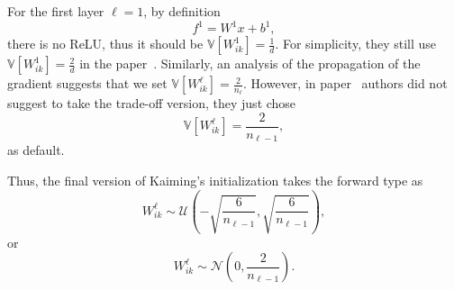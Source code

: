 For the first layer $\ell=1$, by definition
\begin{equation}\label{key}
f^1 = W^1 x + b^1,
\end{equation}
there is no ReLU, thus it should be $\mathbb{V}[W^1_{ik}] = \frac{1}{d}$. 
For simplicity, they still use $\mathbb{V}[W^1_{ik}] = \frac{2}{d}$ in the paper~\cite{he2015delving}.
Similarly, an analysis of the propagation of the gradient suggests that we set 
$\mathbb{V}[W^\ell_{ik}] = \frac{2}{n_{\ell}}$.
However, in paper~\cite{he2015delving} authors did not suggest to take the trade-off version, they just chose 
\begin{equation}\label{key}
\mathbb{V}[W^\ell_{ik}] = \frac{2}{n_{\ell-1}},
\end{equation} as default.

Thus, the final version of Kaiming's initialization takes the forward type as
\begin{equation}
W^{\ell}_{ik} \sim \mathcal{U}(-\sqrt{\frac{6}{n_{\ell-1}}}, \sqrt{\frac{6}{n_{\ell-1}}}),
\end{equation}
or
\begin{equation}
W^{\ell}_{ik} \sim \mathcal{N}(0,  {\frac{2}{n_{\ell-1}}}).
\end{equation}





